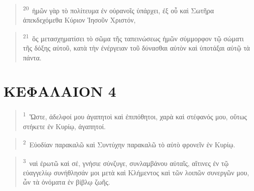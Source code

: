 \documentclass{article}
\newcommand{\currentverse}{1} %
\newcommand{\setcurrentverse}[1]{\renewcommand{\currentverse}{#1}}
\begin{document}
\begin{verse}

\setcurrentverse{20}

\setcounter{footnote}{0}

\textsuperscript{20}~ἡμῶν γὰρ τὸ πολίτευμα ἐν οὐρανοῖς ὑπάρχει, ἐξ οὗ καὶ Σωτῆρα ἀπεκδεχόμεθα Κύριον Ἰησοῦν Χριστόν,

\end{verse}

\begin{verse}

\setcurrentverse{21}

\setcounter{footnote}{0}

\textsuperscript{21}~ὃς μετασχηματίσει τὸ σῶμα τῆς ταπεινώσεως ἡμῶν σύμμορφον τῷ σώματι τῆς δόξης αὐτοῦ, κατὰ τὴν ἐνέργειαν τοῦ δύνασθαι αὐτὸν καὶ ὑποτάξαι αὐτῷ τὰ πάντα.

\end{verse}

\section*{ΚΕΦΑΛΑΙΟΝ 4}

\begin{verse}

\setcurrentverse{1}

\setcounter{footnote}{0}

\textsuperscript{1}~Ὥστε, ἀδελφοί μου ἀγαπητοὶ καὶ ἐπιπόθητοι, χαρὰ καὶ στέφανός μου, οὕτως στήκετε ἐν Κυρίῳ, ἀγαπητοί.

\end{verse}

\begin{verse}

\setcurrentverse{2}

\setcounter{footnote}{0}

\textsuperscript{2}~Εὐοδίαν παρακαλῶ καὶ Συντύχην παρακαλῶ τὸ αὐτὸ φρονεῖν ἐν Κυρίῳ.

\end{verse}

\begin{verse}

\setcurrentverse{3}

\setcounter{footnote}{0}

\textsuperscript{3}~ναὶ ἐρωτῶ καὶ σέ, γνήσιε σύνζυγε, συνλαμβάνου αὐταῖς, αἵτινες ἐν τῷ εὐαγγελίῳ συνήθλησάν μοι μετὰ καὶ Κλήμεντος καὶ τῶν λοιπῶν συνεργῶν μου, ὧν τὰ ὀνόματα ἐν βίβλῳ ζωῆς.

\end{verse}
\end{document}
